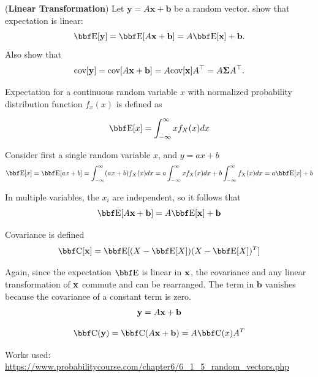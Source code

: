 \documentclass[12pt,letterpaper]{hmcpset}
\begin{document}
\begin{problem}[1]
(\textbf{Linear Transformation}) Let $\mathbf{y} = A\mathbf{x} + \mathbf{b}$ be a random vector.
show that expectation is linear:
\[
    \EE[\yy] = \EE[A\xx + \bb] = A\EE[\xx] + \bb.
\]
Also show that
\[
    {\hbox{cov}}[{\bf y}] = {\hbox{cov}}[A{\bf x} + {\bf b}] = A {\hbox{cov}}[{\bf x}] A^\top = A\hbox{\boldmath$\Sigma$} A^\top.
\]
\end{problem}
\begin{solution}

  Expectation for a continuous random variable $x$ with normalized probability distribution function $f_x(x)$ is defined as

\[
  \EE[x]= \int_{-\infty}^{\infty} xf_X(x)dx
\]

  Consider first a single random variable $x$, and $y = ax + b$
\[
\EE[x] = \EE[ax + b]
         = \int_{-\infty}^{\infty} (ax + b) f_X(x) dx
         = a\int_{-\infty}^{\infty} x f_X(x) dx + b \int_{-\infty}^{\infty} f_X(x) dx
         = a\EE[x] + b
\]

In multiple variables, the $x_i$ are independent, so it follows that
\[
   \EE[A\xx + \bb] = A\EE[\xx] + \bb
\]

Covariance is defined
\[
  \CC[\xx] = \EE[(X - \EE[X])(X - \EE[X])^T]
\]

Again, since the expectation $\EE$ is linear in ${\bf x}$, the covariance and any linear transformation of ${\bf x}$ commute and can be rearranged.  The term in $\mathbf{b}$ vanishes because the covariance of a constant term is zero.
\[
  {\bf y} = A{\bf x} + {\bf b}
\]

\[
  \CC(\yy) = \CC(A\xx + \bb)
           = A\CC(x)A^T
\]

Works used: \url{https://www.probabilitycourse.com/chapter6/6_1_5_random_vectors.php}

    \vfill
\end{solution}
\newpage
\end{document}
